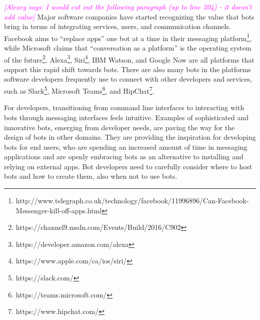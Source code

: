 \documentclass{sig-alternate}
\newcommand{\az}[1]{\textcolor{magenta}{{\it [Alexey says: #1]}}}
\newcommand{\cp}[1]{\textcolor{red}{{\it [Cassie says: #1]}}}
\begin{document}
\az{I would cut out the following paragraph (up to line 204) - it doesn't add value}
Major software companies have started recognizing the value that bots bring in terms of integrating services, users, and communication channels. Facebook aims to ``replace apps'' one bot at a time in their messaging platform\footnote{http://www.telegraph.co.uk/technology/facebook/11996896/Can-Facebook-Messenger-kill-off-apps.html}, while Microsoft claims that ``conversation as a platform'' is the operating system of the future\footnote{https://channel9.msdn.com/Events/Build/2016/C902}. 
Alexa\footnote{https://developer.amazon.com/alexa\label{Alexa}}, Siri\footnote{https://www.apple.com/ca/ios/siri/\label{Siri}}, IBM Watson, and Google Now
are all platforms that support this rapid shift towards bots. 
There are also many bots in the platforms software developers frequently use to connect with other developers and services, such as Slack\footnote{https://slack.com/\label{Slack}}, Microsoft Teams\footnote{https://teams.microsoft.com/\label{Teams}}, and HipChat\footnote{https://www.hipchat.com/\label{Hipchat}}. 


For developers, transitioning from command line interfaces to interacting with bots through messaging interfaces feels intuitive.
Examples of sophisticated and innovative bots, emerging from developer needs, are paving the way for the design of bots in other domains. 
They are providing the inspiration for developing bots for end users, who are spending an increased amount of time in messaging applications and are openly embracing bots as an alternative to installing and relying on external apps.
Bot developers need to carefully consider where to host bots and how to create them, also when not to use bots. 
\end{document}
